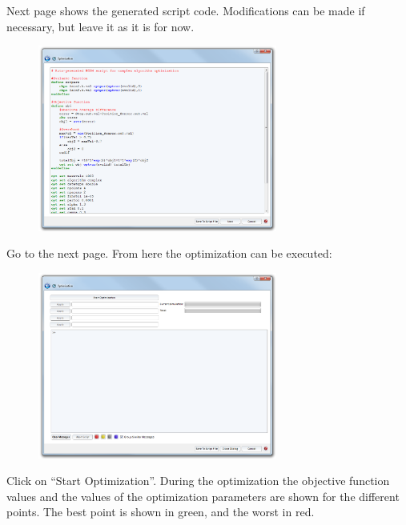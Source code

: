 \documentclass[a4paper,pdftex]{article}
\begin{document}
\begin{tutenumerate}
Next page shows the generated script code. Modifications can be made if necessary, but leave it as it is for now.

\FloatBarrier
\begin{figure}[htb]
\center
\includegraphics[width=0.7\textwidth]{gfx/optimization/screenshot-opt4.png}
\end{figure}
\FloatBarrier

Go to the next page. From here the optimization can be executed:

\FloatBarrier
\begin{figure}[htb]
\center
\includegraphics[width=0.7\textwidth]{gfx/optimization/screenshot-opt5a.png}
\end{figure}
\FloatBarrier

Click on \enquote{Start Optimization}. During the optimization the objective function values and the values of the optimization parameters are shown for the different points. The best point is shown in green, and the worst in red.


\end{tutenumerate}
\end{document}
